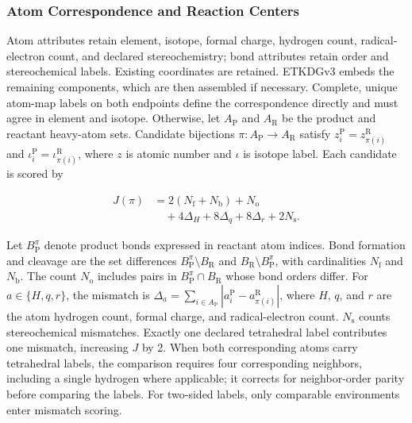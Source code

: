 \subsubsection{Atom Correspondence and Reaction Centers}
Atom attributes retain element, isotope, formal charge, hydrogen count, radical-electron count, and declared stereochemistry; bond attributes retain order and stereochemical labels. Existing coordinates are retained. ETKDGv3 \citep{ref12,etkdg2020,ref13} embeds the remaining components, which are then assembled if necessary. Complete, unique atom-map labels on both endpoints define the correspondence directly and must agree in element and isotope. Otherwise, let $A_{\mathrm{P}}$ and $A_{\mathrm{R}}$ be the product and reactant heavy-atom sets. Candidate bijections $\pi:A_{\mathrm{P}}\to A_{\mathrm{R}}$ satisfy $z_i^{\mathrm{P}}=z_{\pi(i)}^{\mathrm{R}}$ and $\iota_i^{\mathrm{P}}=\iota_{\pi(i)}^{\mathrm{R}}$, where $z$ is atomic number and $\iota$ is isotope label. Each candidate is scored by

\begin{equation}\label{eq:methods-01}
\begin{aligned}
J(\pi)&=2(N_{\mathrm{f}}+N_{\mathrm{b}})+N_{\mathrm{o}}\\
&\quad{}+4\Delta_H+8\Delta_q+8\Delta_r+2N_{\mathrm{s}}.
\end{aligned}
\end{equation}

Let $B_{\mathrm{P}}^\pi$ denote product bonds expressed in reactant atom indices. Bond formation and cleavage are the set differences $B_{\mathrm{P}}^\pi\setminus B_{\mathrm{R}}$ and $B_{\mathrm{R}}\setminus B_{\mathrm{P}}^\pi$, with cardinalities $N_{\mathrm{f}}$ and $N_{\mathrm{b}}$. The count $N_{\mathrm{o}}$ includes pairs in $B_{\mathrm{P}}^\pi\cap B_{\mathrm{R}}$ whose bond orders differ. For $a\in\{H,q,r\}$, the mismatch is $\Delta_a=\sum_{i\in A_{\mathrm{P}}}|a_i^{\mathrm{P}}-a_{\pi(i)}^{\mathrm{R}}|$, where $H$, $q$, and $r$ are the atom hydrogen count, formal charge, and radical-electron count. $N_{\mathrm{s}}$ counts stereochemical mismatches. Exactly one declared tetrahedral label contributes one mismatch, increasing $J$ by 2. When both corresponding atoms carry tetrahedral labels, the comparison requires four corresponding neighbors, including a single hydrogen where applicable; it corrects for neighbor-order parity before comparing the labels. For two-sided labels, only comparable environments enter mismatch scoring.

